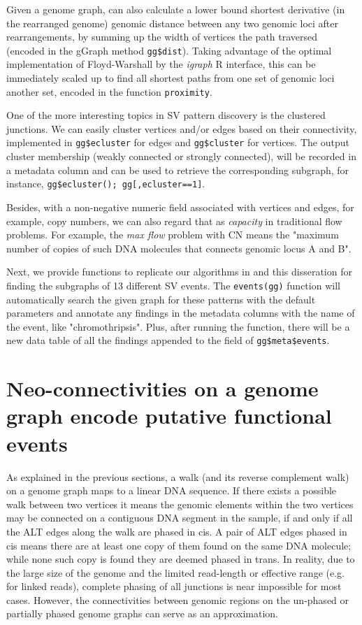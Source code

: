 \documentclass[phd,tocprelim]{cornell}
\begin{document}
Given a genome graph, can also calculate a lower bound  shortest derivative (in the rearranged genome) genomic distance between any two genomic loci after rearrangements, by summing up the width of vertices the path traversed (encoded in the gGraph method \texttt{gg\$dist}). Taking advantage of the optimal implementation of Floyd-Warshall by the \textit{igraph} R interface, this can be immediately scaled up to find all shortest paths from one set of genomic loci another set, encoded in the function \texttt{proximity}.

One of the more interesting topics in SV pattern discovery is the clustered junctions. We can easily cluster vertices and/or edges based on their connectivity, implemented in \texttt{gg\$ecluster} for edges and \texttt{gg\$cluster} for vertices. The output cluster membership (weakly connected or strongly connected), will be recorded in a metadata column and can be used to retrieve the corresponding subgraph, for instance, \texttt{gg\$ecluster(); gg[,ecluster==1]}.

Besides, with a non-negative numeric field associated with vertices and edges, for example, copy numbers, we can also regard that as \textit{capacity} in traditional flow problems. For example, the \textit{max flow} problem with CN means the "maximum number of copies of such DNA molecules that connects genomic locus A and B".

Next, we provide functions to replicate our algorithms in \cite{Hadi2020-um} and this disseration for finding the subgraphs of 13 different SV events. The \texttt{events(gg)} function will automatically search the given graph for these patterns with the default parameters and annotate any findings in the metadata columns with the name of the event, like "chromothripsis". Plus, after running the function, there will be a new data table of all the findings appended to the field of \texttt{gg\$meta\$events}.

\section{Neo-connectivities on a genome graph encode putative functional events}
As explained in the previous sections, a walk (and its reverse complement walk) on a genome graph maps to a linear DNA sequence. If there exists a possible walk between two vertices it means the genomic elements within the two vertices may be connected on a contiguous DNA segment in the sample, if and only if all the ALT edges along the walk are phased in cis. A pair of ALT edges phased in cis means there are at least one copy of them found on the same DNA molecule; while none such copy is found they are deemed phased in trans. In reality, due to the large size of the genome and the limited read-length or effective range (e.g. for linked reads), complete phasing of all junctions is near impossible for most cases. However, the connectivities between genomic regions on the un-phased or partially phased genome graphs can serve as an approximation.
\end{document}
